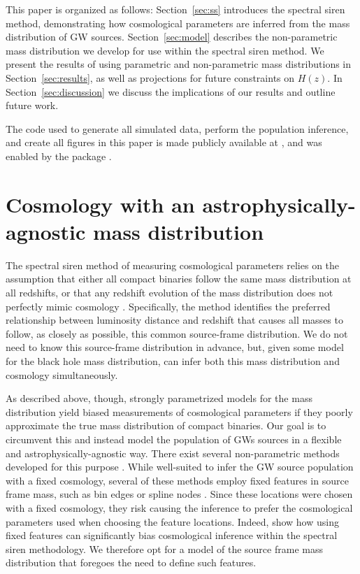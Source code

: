 \documentclass[preprint2,linenumbers]{aastex631}
\begin{document}
This paper is organized as follows: Section~\ref{sec:ss} introduces the spectral siren method, demonstrating how cosmological parameters are inferred from the mass distribution of \ac{GW} sources.
Section~\ref{sec:model} describes the non-parametric mass distribution we develop for use within the spectral siren method.
We present the results of using parametric and non-parametric mass distributions in Section~\ref{sec:results}, as well as projections for future constraints on $H(z)$.
In Section~\ref{sec:discussion} we discuss the implications of our results and outline future work.

The code used to generate all simulated data, perform the population inference, and create all figures in this paper is made publicly available at , and was enabled by the \showyourwork package \citep{Luger2021}.

\section{Cosmology with an astrophysically-agnostic mass distribution}
\label{sec:methods}

The spectral siren method of measuring cosmological parameters relies on the assumption that either all compact binaries follow the same mass distribution at all redshifts, or that any redshift evolution of the mass distribution does not perfectly mimic cosmology \citep[i.e. all features do not simultaneously exhibit an {\em identical}\/ monotonic rightward shift with redshift;][]{ezquiaga_spectral_2022}.
Specifically, the method identifies the preferred relationship between luminosity distance and redshift that causes all masses to follow, as closely as possible, this common source-frame distribution.
We do not need to know this source-frame distribution in advance, but, given some model for the black hole mass distribution, can infer both this mass distribution and cosmology simultaneously.

As described above, though, strongly parametrized models for the mass distribution yield biased measurements of cosmological parameters if they poorly approximate the true mass distribution of compact binaries.
Our goal is to circumvent this and instead model the population of \acp{GW} sources in a flexible and astrophysically-agnostic way. 
There exist several non-parametric methods developed for this purpose \citep{tiwari_vamana_2021,edelman_aint_2022,sadiq_flexible_2022,edelman_cover_2023,mandel_extracting_2019,ray_non-parametric_2023}.
While well-suited to infer the \ac{GW} source population with a fixed cosmology, several of these methods employ fixed features in source frame mass, such as bin edges \citep{mandel_extracting_2019,ray_non-parametric_2023} or spline nodes \citep{edelman_aint_2022}.
Since these locations were chosen with a fixed cosmology, they risk causing the inference to prefer the cosmological parameters used when choosing the feature locations. 
Indeed, \citet{mastrogiovanni_importance_2021} show how using fixed features can significantly bias cosmological inference within the spectral siren methodology.
We therefore opt for a model of the source frame mass distribution that foregoes the need to define such features.
\end{document}

